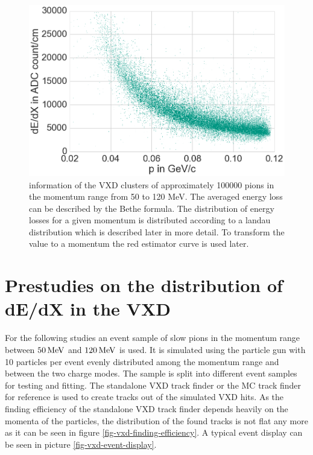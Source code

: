 \begin{figure}
 \centering
 \includegraphics[width=0.8\linewidth]{figures/vxd/dedx.png}
 \caption[\dedx information of the VXD clusters.]{\dedx information of the VXD clusters of approximately 100000 pions in the momentum range from 50 to 120 MeV. The averaged energy loss can be described by the Bethe formula. The distribution of energy losses for a given momentum is distributed according to a landau distribution which is described later in more detail. To transform the \dedx value to a momentum the red estimator curve is used later.}
 \label{fig-dedx-over-p}
\end{figure}


\section{Prestudies on the distribution of dE/dX in the VXD}

For the following studies an event sample of slow pions in the momentum range between $\unit[50]{MeV}$ and $\unit[120]{MeV}$ is used. It is simulated using the particle gun with 10 particles per event evenly distributed among the momentum range and between the two charge modes. The sample is split into different event samples for testing and fitting. The standalone VXD track finder or the MC track finder for reference is used to create tracks out of the simulated VXD hits. As the finding efficiency of the standalone VXD track finder depends heavily on the momenta of the particles, the distribution of the found tracks is not flat any more as it can be seen in figure \ref{fig-vxd-finding-efficiency}. A typical event display can be seen in picture \ref{fig-vxd-event-display}.

